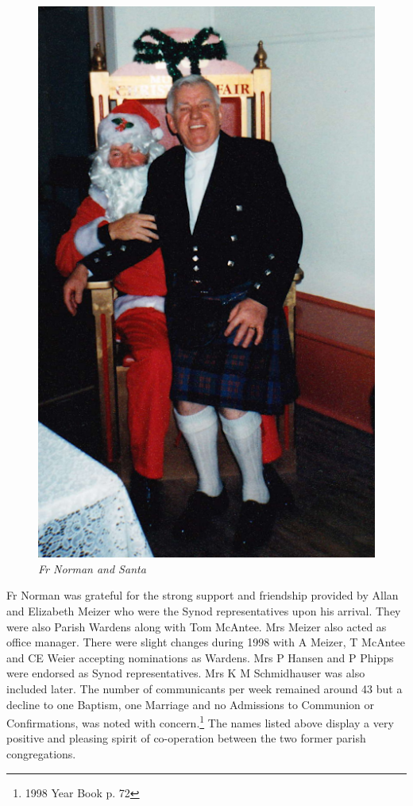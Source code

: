 \begin{figure}
\begin{center}
\includegraphics[width=.8\linewidth,center]{../images/frNormanSanta.png}
\caption{\itshape Fr Norman and Santa}
\end{center}
\end{figure}




Fr Norman was grateful for the strong support and friendship provided by Allan and Elizabeth Meizer who were the Synod representatives upon his arrival. They were also Parish Wardens along with Tom McAntee. Mrs Meizer also acted as office manager. There were slight changes during 1998 with A Meizer, T McAntee and CE Weier accepting nominations as Wardens. Mrs P Hansen and P Phipps were endorsed as Synod representatives. Mrs K M Schmidhauser was also included later. The number of communicants per week remained around 43 but a decline to one Baptism, one Marriage and no Admissions to Communion or Confirmations, was noted with concern.\footnote{1998 Year Book p. 72} The names listed above display a very positive and pleasing spirit of co-operation between the two former parish congregations.


